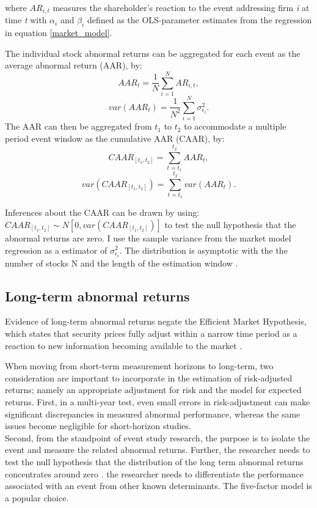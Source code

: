  where $AR_{i,t}$ measures the shareholder's reaction to the event addressing firm \textit{i} at time \textit{t}  with $\alpha_i$ and $\beta_i$ defined as the OLS-parameter estimates from the regression in equation \ref{market_model}.
  
 The individual stock abnormal returns can be aggregated for each event as the average abnormal return (AAR), by:  
 \begin{equation}
 AAR_t = \frac{1}{N} \sum_{i=1} ^N AR_{i,t},
 \end{equation}
 \begin{equation}
 var(AAR_{t}) = \frac{1}{N^2} \sum_{i=1} ^N \sigma_{\epsilon_i} ^2.
 \end{equation}
 The AAR can then be aggregated from $t_1$ to $t_2$ to accommodate a multiple period event window as the cumulative AAR (CAAR), by:
 \begin{equation}
 CAAR_{[t_1,t_2]} = \sum_{t = t_1 } ^{t_2} AAR_{t},
 \end{equation}
 \begin{equation}
 var(CAAR_{[t_1,t_2]}) = \sum ^{t_2}_{t=t_1} var(AAR_t).
 \end{equation}
 
Inferences about the CAAR can be drawn by using: $CAAR_{[t_1,t_2]} \sim N[0,var(CAAR_{[t_1,t_2]})]$ to test the null hypothesis that the abnormal returns are zero. I use the sample variance from the market model regression as a estimator of $\sigma^2_{\epsilon_i}$. The distribution is asymptotic with the the number of stocks N and the length of the estimation window \cite{Event_studies}.  
 
 

\subsection{Long-term abnormal returns}

Evidence of long-term abnormal returns negate the Efficient Market Hypothesis, which states that security prices fully adjust within a narrow time period as a reaction to new information becoming available to the market \citep{fama1969_EMH}. 

When moving from short-term measurement horizons to long-term, two consideration are important to incorporate in the estimation of risk-adjusted returns; namely an appropriate adjustment for risk and the model for expected returns. First, in a multi-year test, even small errors in risk-adjustment can make significant discrepancies in measured abnormal performance, whereas the same issues become negligible for short-horizon studies. \\
Second, from the standpoint of event study research, the purpose is to isolate the event and measure the related abnormal returns. Further, the researcher needs to test the null hypothesis that the distribution of the long term abnormal returns concentrates around zero \citep{Ang_event_method}. the researcher needs to differentiate the performance associated with an event from other known determinants. The \cite{Fama_french_3fac} five-factor model is a popular choice. 

